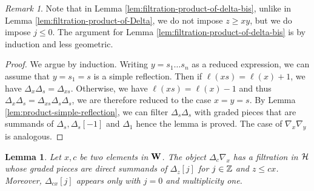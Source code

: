 \documentclass[article, 10pt, oneside, reqno]{amsart}
\theoremstyle{plain}
\newtheorem{lem}[thm]{Lemma}
\theoremstyle{definition}
\theoremstyle{remark}
\newtheorem{rque}[thm]{Remark}
\begin{document}
\begin{rque}
Note that in Lemma \ref{lem:filtration-product-of-delta-bis}, unlike in Lemma \ref{lem:filtration-product-of-Delta}, we do not impose $z \geq xy$, but we do impose $j \leq 0$. The argument for Lemma \ref{lem:filtration-product-of-delta-bis} is by induction and less geometric. 
\end{rque}

\begin{proof}
We argue by induction. Writing $y = s_1\dots s_n$ as a reduced expression, we can assume that $y = s_1 = s$ is a simple reflection. Then if $\ell(xs) = \ell(x) + 1$, we have $\Delta_x\Delta_s = \Delta_{xs}$. Otherwise, we have $\ell(xs) = \ell(x) - 1$ and thus $\Delta_x\Delta_s = \Delta_{xs}\Delta_s\Delta_s$, we are therefore reduced to the case $x = y = s$. By Lemma \ref{lem:product-simple-reflection}, we can filter $\Delta_s\Delta_s$ with graded pieces that are summands of $\Delta_s, \Delta_s[-1]$ and $\Delta_1$ hence the lemma is proved. The case of $\nabla_x\nabla_y$ is analogous.
\end{proof}

\begin{lem}\label{lem:filtration-product-of-delta-nabla}
Let $x,c$ be two elements in $\mathbf{W}$. The object $\Delta_c\nabla_{x}$ has a filtration in $\mathcal{H}$ whose graded pieces are direct summands of $\Delta_z[j]$ for $j \in \mathbb{Z}$ and $z \leq cx$.
Moreover, $\Delta_{cx}[j]$ appears only with $j = 0$ and multiplicity one.
\end{lem}
\end{document}
